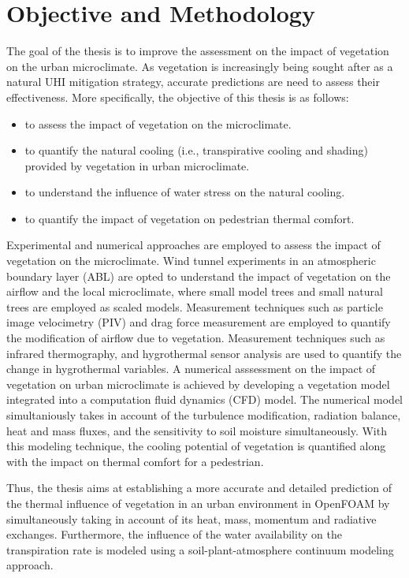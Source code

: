 \section{Objective and Methodology}

The goal of the thesis is to improve the assessment on the impact of vegetation on the urban microclimate. As vegetation is increasingly being sought after as a natural UHI mitigation strategy, accurate predictions are need to assess their effectiveness. More specifically, the objective of this thesis is as follows:
\begin{itemize}
	\item to assess the impact of vegetation on the microclimate.
	
	\item to quantify the natural cooling (i.e., transpirative cooling and shading) provided by vegetation in urban microclimate.
	
	\item to understand the influence of water stress on the natural cooling.
	
	\item to quantify the impact of vegetation on pedestrian thermal comfort. 
\end{itemize}

Experimental and numerical approaches are employed to assess the impact of vegetation on the microclimate. Wind tunnel experiments in an atmospheric boundary layer (ABL) are opted to understand the impact of vegetation on the airflow and the local microclimate, where small model trees and small natural trees are employed as scaled models. Measurement techniques such as particle image velocimetry (PIV) and drag force measurement are employed to quantify the modification of airflow due to vegetation. Measurement techniques such as infrared thermography, and hygrothermal sensor analysis are used to quantify the change in hygrothermal variables. A numerical asssessment on the impact of vegetation on urban microclimate is achieved by developing a vegetation model integrated into a computation fluid dynamics  (CFD) model. The numerical model simultaniously takes in account of the turbulence modification, radiation balance, heat and mass fluxes, and the sensitivity to soil moisture simultaneously. With this modeling technique, the cooling potential of vegetation is quantified along with the impact on thermal comfort for a pedestrian. 

Thus, the thesis aims at establishing a more accurate and detailed prediction of the thermal influence of vegetation in an urban environment in OpenFOAM by simultaneously taking in account of its heat, mass, momentum and radiative exchanges. Furthermore, the influence of the water availability on the transpiration rate is modeled using a soil-plant-atmosphere continuum modeling approach. 

